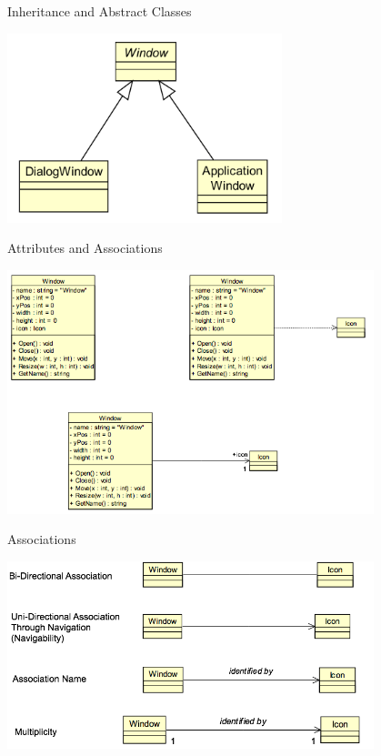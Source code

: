 \documentclass[aspectratio=1610,xcolor=dvipsnames,t,compress]{beamer}
\begin{document}
\begin{frame}{Inheritance and Abstract Classes} 
    \begin{center}
        \includegraphics[width=0.6\textwidth]{images/inheritance} 
    \end{center} 
\end{frame} 

\begin{frame}{Attributes and Associations} 
    \begin{center}
        \includegraphics[width=0.8\textwidth]{images/attributes} 
    \end{center} 
\end{frame} 

\begin{frame}{Associations} 
    \begin{center}
        \includegraphics[width=0.8\textwidth]{images/associations} 
    \end{center} 
\end{frame} 
\end{document}
